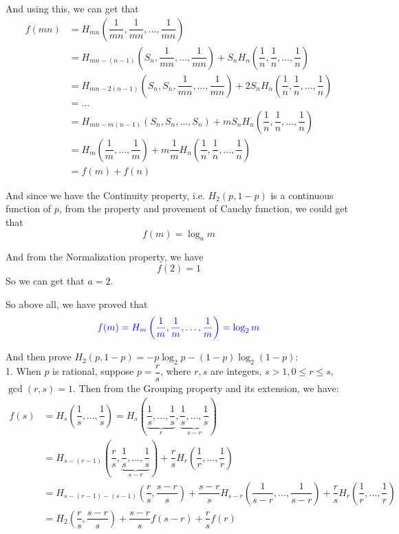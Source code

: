 And using this, we can get that
\begin{align*}
f(mn) &= H_{mn}\left(\dfrac{1}{mn}, \dfrac{1}{mn}, \ldots, \dfrac{1}{mn}\right) \\
&= H_{mn-(n-1)}\left(S_n, \dfrac{1}{mn}, \ldots, \dfrac{1}{mn}\right)+S_n H_n\left(\dfrac{1}{n}, \dfrac{1}{n}, \ldots, \dfrac{1}{n}\right) \\
&= H_{mn-2(n-1)}\left(S_n, S_n, \dfrac{1}{mn}, \ldots, \dfrac{1}{mn}\right)+2 S_n H_n\left(\dfrac{1}{n}, \dfrac{1}{n}, \ldots, \dfrac{1}{n}\right) \\
&= \ldots \\
&= H_{mn-m(n-1)}\left(S_n, S_n, \ldots, S_n\right)+m S_n H_n\left(\dfrac{1}{n}, \dfrac{1}{n}, \ldots, \dfrac{1}{n}\right) \\
&= H_m\left(\dfrac{1}{m}, \ldots, \dfrac{1}{m}\right) + m \dfrac{1}{m} H_n\left(\dfrac{1}{n}, \dfrac{1}{n}, \ldots, \dfrac{1}{n}\right) \\
&= f(m) + f(n)
\end{align*}

And since we have the Continuity property, i.e. $H_2(p, 1-p)$ is a continuous function of $p$, from the property and provement of Cauchy function, we could get that
$$f(m) = \log_a m$$

And from the Normalization property, we have
$$f(2) = 1$$
So we can get that $a=2$.

So above all, we have proved that
$$\textcolor{blue}{f(m)=H_m\left(\dfrac{1}{m}, \dfrac{1}{m}, \ldots, \dfrac{1}{m}\right)= \log_2 m}$$

And then prove $H_2(p,1-p) = -p\log_2p - (1-p)\log_2(1-p)$: \\
1. When $p$ is rational, suppose $p = \dfrac{r}{s}$, where $r,s$ are integers, $s>1,0\leq r\leq s$, $\gcd(r,s)=1$. Then from the Grouping property and its extension, we have:
\begin{align*}
f(s) &= H_s\left(\dfrac{1}{s},\ldots,\dfrac{1}{s}\right) = H_{s}\left(\underbrace{\dfrac{1}{s},\ldots,\dfrac{1}{s}}_r,\underbrace{\dfrac{1}{s},\ldots,\dfrac{1}{s}}_{s-r}\right) \\
&= H_{s-(r-1)}\left(\dfrac{r}{s},\underbrace{\dfrac{1}{s},\ldots,\dfrac{1}{s}}_{s-r}\right)+\dfrac{r}{s}H_r\left(\dfrac{1}{r},\ldots,\dfrac{1}{r}\right) \\
&= H_{s-(r-1)-(s-1)}\left(\dfrac{r}{s},\dfrac{s-r}{s}\right) + \dfrac{s-r}{s}H_{s-r}\left(\dfrac{1}{s-r},\ldots,\dfrac{1}{s-r}\right) + \dfrac{r}{s}H_r\left(\dfrac{1}{r},\ldots,\dfrac{1}{r}\right) \\
&= H_2(\dfrac{r}{s},\dfrac{s-r}{s}) + \dfrac{s-r}{s}f(s-r) + \dfrac{r}{s}f(r)
\end{align*}

